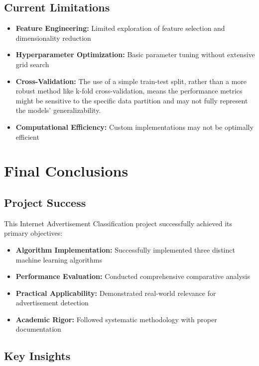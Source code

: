 \subsection{Current Limitations}

\begin{itemize}
    \item \textbf{Feature Engineering:} Limited exploration of feature selection and dimensionality reduction
    \item \textbf{Hyperparameter Optimization:} Basic parameter tuning without extensive grid search
    \item \textbf{Cross-Validation:} The use of a simple train-test split, rather than a more robust method like k-fold cross-validation, means the performance metrics might be sensitive to the specific data partition and may not fully represent the models' generalizability.
    \item \textbf{Computational Efficiency:} Custom implementations may not be optimally efficient
\end{itemize}



\section{Final Conclusions}

\subsection{Project Success}

This Internet Advertisement Classification project successfully achieved its primary objectives:

\begin{itemize}
    \item \textbf{Algorithm Implementation:} Successfully implemented three distinct machine learning algorithms
    \item \textbf{Performance Evaluation:} Conducted comprehensive comparative analysis
    \item \textbf{Practical Applicability:} Demonstrated real-world relevance for advertisement detection
    \item \textbf{Academic Rigor:} Followed systematic methodology with proper documentation
\end{itemize}

\subsection{Key Insights}

